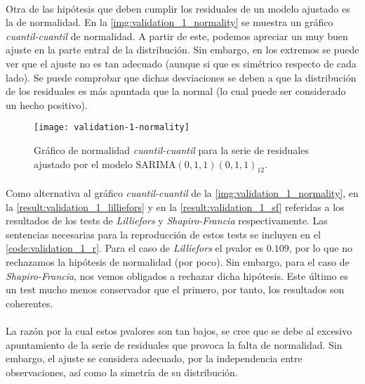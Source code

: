 \documentclass[a4paper, spanish]{article}
\begin{document}
      \paragraph{}
      Otra de las hipótesis que deben cumplir los residuales de un modelo ajustado es la de normalidad. En la \autoref{img:validation_1_normality} se muestra un gráfico \emph{cuantil-cuantil} de normalidad. A partir de este, podemos apreciar un muy buen ajuste en la parte entral de la distribución. Sin embargo, en los extremos se puede ver que el ajuste no es tan adecuado (aunque si que es simétrico respecto de cada lado). Se puede comprobar que dichas desviaciones se deben a que la distribución de los residuales es más apuntada que la normal (lo cual puede ser considerado un hecho positivo).

      \begin{figure}[htb!]
        \centering
        \texttt{[image: validation-1-normality]}
        \caption{Gráfico de normalidad \emph{cuantil-cuantil} para la serie de residuales ajustado por el modelo $\text{SARIMA}(0, 1, 1)(0, 1, 1)_{12}$.}
        \label{img:validation_1_normality}
      \end{figure}

      \paragraph{}
      Como alternativa al gráfico \emph{cuantil-cuantil} de la \autoref{img:validation_1_normality}, en la \autoref{result:validation_1_lilliefors} y en la \autoref{result:validation_1_sf} referidas a los resultados de los tests de \emph{Lilliefors} y \emph{Shapiro-Francia} respectivamente. Las sentencias necesarias para la reproducción de estos tests se incluyen en el \autoref{code:validation_1_r}. Para el caso de \emph{Lilliefors} el pvalor es $0.109$, por lo que no rechazamos la hipótesis de normalidad (por poco). Sin embargo, para el caso de \emph{Shapiro-Francia}, nos vemos obligados a rechazar dicha hipótesis. Este último es un test mucho menos conservador que el primero, por tanto, los resultados son coherentes.

      \paragraph{}
      La razón por la cual estos pvalores son tan bajos, se cree que se debe al excesivo apuntamiento de la serie de residuales que provoca la falta de normalidad. Sin embargo, el  ajuste se considera adecuado, por la independencia entre observaciones, así como la simetría de su distribución.
\end{document}
